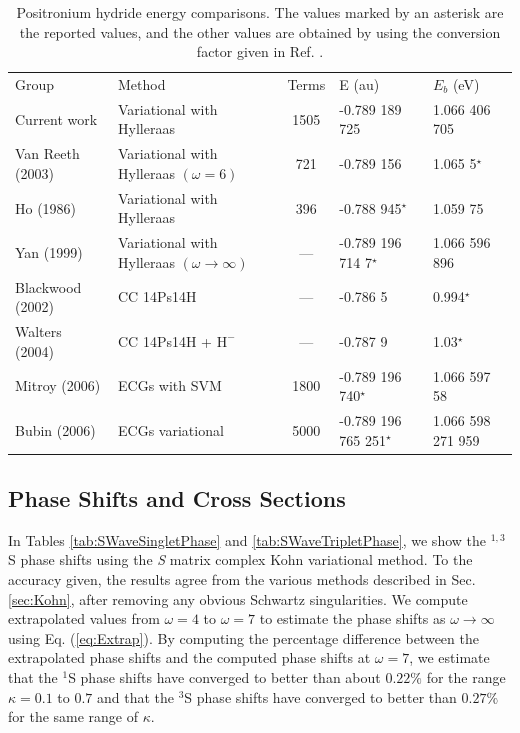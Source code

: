 \documentclass[preprint,showpacs,preprintnumbers,amsmath,amssymb,longbibliography,pra,aps]{revtex4-1}
\begin{document}
\squeezetable  %
\begin{table}
\begin{center}
\begin{ruledtabular}  %
\begin{tabular}{l l c l l}
Group & Method & Terms & E (au) & $E_b$ (eV)\\
\colrule
Current work & Variational with Hylleraas & 1505 & -0.789 189 725 & 1.066 406 705 \\
Van Reeth (2003) \cite{VanReeth2003} & Variational with Hylleraas $(\omega = 6)$ & 721 & -0.789 156 & 1.065 5$^\star$ \\
Ho (1986) \cite{Ho1986} & Variational with Hylleraas & 396 & -0.788 945$^\star$ & 1.059 75 \\
Yan (1999) \cite{Yan1999} & Variational with Hylleraas $(\omega \rightarrow \infty)$ & --- & -0.789 196 714 7$^\star$ & 1.066 596 896 \\
Blackwood (2002) \cite{Blackwood2002} & CC 14Ps14H & --- & -0.786 5 & 0.994$^\star$ \\
Walters (2004) \cite{Walters2004} & CC 14Ps14H + $\text{H}^-$ & --- & -0.787 9 & 1.03$^\star$\\
Mitroy (2006) \cite{Mitroy2006} & ECGs with SVM & 1800 & -0.789 196 740$^\star$ & 1.066 597 58 \\
Bubin (2006) \cite{Bubin2006} & ECGs variational & 5000 & -0.789 196 765 251$^\star$ & 1.066 598 271 959 \\
\end{tabular}
\end{ruledtabular}
\caption{Positronium hydride energy comparisons. The values marked by an asterisk are the reported values, and the other values are obtained by using the conversion factor given in Ref. \cite{Mohr2012,*NISTConversions}.}
\label{tab:BoundEnergy}
\end{center}
\end{table}

\subsection{Phase Shifts and Cross Sections}

In Tables \ref{tab:SWaveSingletPhase} and \ref{tab:SWaveTripletPhase}, we show the $^{1,3}$S phase shifts using the \emph{S} matrix complex Kohn variational method. To the accuracy given, the results agree from the various methods described in Sec. \ref{sec:Kohn}, after removing any obvious Schwartz singularities. We compute extrapolated values from $\omega = 4$ to $\omega = 7$ to estimate the phase shifts as $\omega \rightarrow \infty$ using Eq. (\ref{eq:Extrap}). By computing the percentage difference between the extrapolated phase shifts and the computed phase shifts at $\omega=7$, we estimate that the $^1$S phase shifts have converged to better than about $0.22\%$ for the range $\kappa=0.1$ to $0.7$ and that the $^3$S phase shifts have converged to better than $0.27\%$ for the same range of $\kappa$.
\end{document}
